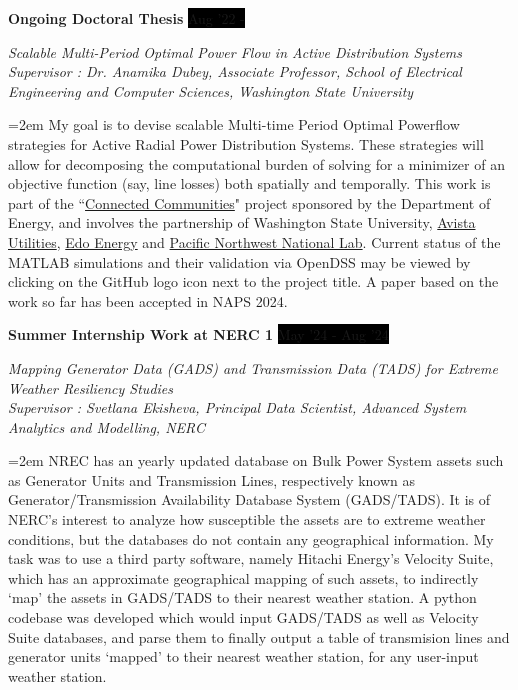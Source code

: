 \documentclass[paper=a4,fontsize=11pt]{scrartcl} %
\newcommand{\sepspace}{\vspace*{1em}}		%
\newcommand{\EducationEntry}[4]{
		\noindent \textbf{#1} \hfill      %
		\colorbox{Black}{%
			\parbox{10em}{%
			\hfill\color{White}#2}} \par  %
		\noindent \textit{#3} \par        %
		\noindent\hangindent=2em\hangafter=0 \small #4 %
		\normalsize \par}
\newcommand{\WorkEntry}[4]{				  %
		\noindent \textbf{#1} \hfill      %
		\colorbox{Black}{\color{White}#2} \par  %
		\noindent \textit{#3} \par              %
		\noindent\hangindent=2em\hangafter=0 \small #4 %
		\normalsize \par}
\begin{document}
\WorkEntry{Ongoing Doctoral Thesis}{Aug '22 - }{Scalable Multi-Period Optimal Power Flow in Active Distribution Systems \href{https://github.com/Realife-Brahmin/MultiPeriod-DistOPF-Benchmark}{\textcolor{matlaborange}{\faGithub}}\\ Supervisor : Dr. Anamika Dubey, Associate Professor, School of Electrical Engineering and Computer Sciences, Washington State University}{My goal is to devise scalable Multi-time Period Optimal Powerflow strategies for Active Radial Power Distribution Systems. These strategies will allow for decomposing the computational burden of solving for a minimizer of an objective function (say, line losses) both spatially and temporally. This work is part of the ``\href{https://www.energy.gov/eere/solar/connected-communities-funding-program}{Connected Communities}" project sponsored by the Department of Energy, and involves the partnership of Washington State University, \href{https://investor.avistacorp.com/}{Avista Utilities}, \href{https://edoenergy.com/about-edo/}{Edo Energy} and \href{https://www.pnnl.gov/about}{Pacific Northwest National Lab}. Current status of the MATLAB simulations and their validation via OpenDSS may be viewed by clicking on the GitHub logo icon next to the project title. A paper based on the work so far has been accepted in NAPS 2024.}

\sepspace 

\WorkEntry{Summer Internship Work at NERC 1}{May '24 - Aug '24}{Mapping Generator Data (GADS) and Transmission Data (TADS) for Extreme Weather Resiliency Studies \href{https://github.com/Realife-Brahmin/Mapping-GADS-and-TADS-repo}{\textcolor{pythonblue}{\faGithub}}\\ Supervisor : Svetlana Ekisheva, Principal Data Scientist, Advanced System Analytics and Modelling, NERC}
{NREC has an yearly updated database on Bulk Power System assets such as Generator Units and Transmission Lines, respectively known as Generator/Transmission Availability Database System (GADS/TADS). It is of NERC's interest to analyze how susceptible the assets are to extreme weather conditions, but the databases do not contain any geographical information. My task was to use a third party software, namely Hitachi Energy's Velocity Suite, which has an approximate geographical mapping of such assets, to indirectly `map' the assets in GADS/TADS to their nearest weather station. A python codebase was developed which would input GADS/TADS as well as Velocity Suite databases, and parse them to finally output a table of transmision lines and generator units `mapped' to their nearest weather station, for any user-input weather station.}
\end{document}
